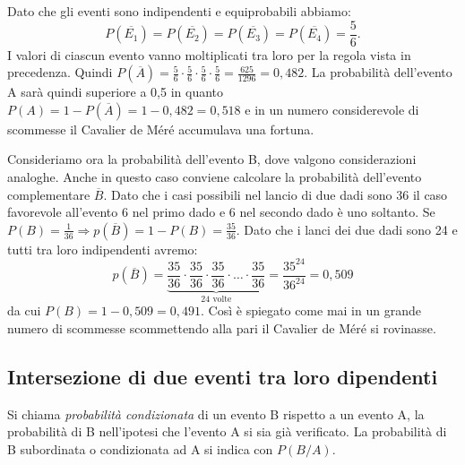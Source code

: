 Dato che gli eventi sono indipendenti e equiprobabili abbiamo: \[ 
P(\overline{E_1})=P(\overline{E_2})=P(\overline{E_3})=P(\overline{E_4})=\frac 
5 
6. \]
I valori di ciascun evento vanno moltiplicati tra loro per la regola vista in 
precedenza. Quindi \(P(\overline A)=\frac 5 6\cdot \frac 5 6\cdot \frac 5 
6\cdot 
\frac 5 6=\frac{625}{1296}=0,482\).
La probabilità dell'evento A sarà quindi superiore a 0,5 in quanto 
\(P(A)=1-P(\overline A)=1-0,482=0,518\) e in un numero considerevole di 
scommesse 
il Cavalier de Méré accumulava una fortuna.

Consideriamo ora la probabilità dell'evento B, dove valgono considerazioni 
analoghe. Anche in questo caso conviene calcolare la probabilità dell'evento 
complementare \(\overline B\). Dato che i casi possibili nel lancio di due dadi 
sono 36 il caso favorevole all'evento 6 nel primo dado e 6 nel secondo dado è 
uno soltanto. Se \(P(B)=\frac 1{36} \Rightarrow p(\overline 
B)=1-P(B)=\frac{35}{36}\). Dato che i lanci dei due dadi sono 24 e tutti tra 
loro 
indipendenti avremo:
 \[ p(\overline 
B)=\underbrace{\frac{35}{36}\cdot\frac{35}{36}\cdot\frac{35}{36}
\cdot\ldots\cdot\frac{35}{36}}_{24\text{ 
volte}}=\frac{35^{24}}{36^{24}}=0,509 
\]
 da cui \(P(B)=1-0,509=0,491\). Così è spiegato come mai in un grande numero di 
scommesse scommettendo alla pari il Cavalier de Méré si rovinasse.


\subsection{Intersezione di due eventi tra loro dipendenti}
\begin{definizione}
Si chiama \emph{probabilità condizionata} di un evento B rispetto a un evento 
A, 
la probabilità di B nell'ipotesi che l'evento A si sia già verificato. La 
probabilità di B subordinata o condizionata ad A si indica con \(P(B/A)\).
\end{definizione}

